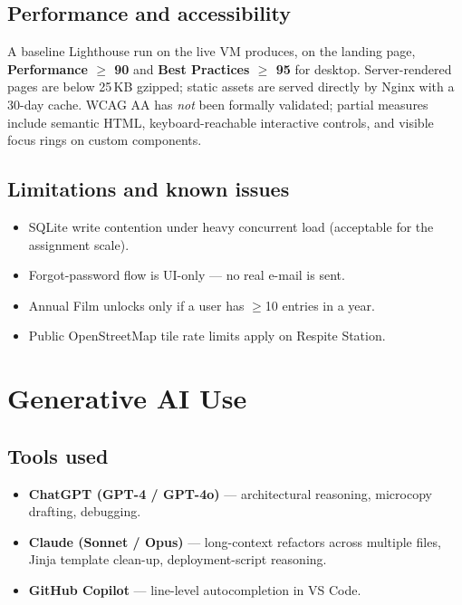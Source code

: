 \subsection{Performance and accessibility}
A baseline Lighthouse run on the live VM produces, on the landing page,
\textbf{Performance $\geq$ 90} and \textbf{Best Practices $\geq$ 95} for
desktop. Server-rendered pages are below 25\,KB gzipped; static assets
are served directly by Nginx with a 30-day cache. WCAG AA has \emph{not}
been formally validated; partial measures include semantic HTML,
keyboard-reachable interactive controls, and visible focus rings on
custom components.

\subsection{Limitations and known issues}
\begin{itemize}
  \item SQLite write contention under heavy concurrent load (acceptable
        for the assignment scale).
  \item Forgot-password flow is UI-only — no real e-mail is sent.
  \item Annual Film unlocks only if a user has $\geq$10 entries in a year.
  \item Public OpenStreetMap tile rate limits apply on Respite Station.
\end{itemize}

\section{Generative AI Use}\label{sec:ai}

\subsection{Tools used}
\begin{itemize}
  \item \textbf{ChatGPT (GPT-4 / GPT-4o)} — architectural reasoning,
        microcopy drafting, debugging.
  \item \textbf{Claude (Sonnet / Opus)} — long-context refactors across
        multiple files, Jinja template clean-up, deployment-script
        reasoning.
  \item \textbf{GitHub Copilot} — line-level autocompletion in VS Code.
\end{itemize}

